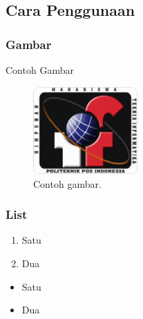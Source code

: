 \subsection{Cara Penggunaan}
\subsubsection{Gambar}

\hfill\break

Contoh Gambar
\begin{figure}[H]
	\includegraphics[width=4cm]{figures/himatif.png}
	\centering
	\caption{Contoh gambar.}
\end{figure}

\subsubsection{List}
\begin{enumerate}
	\item Satu
	\item Dua
\end{enumerate}

\begin{itemize}
	\item Satu
	\item Dua
\end{itemize}

